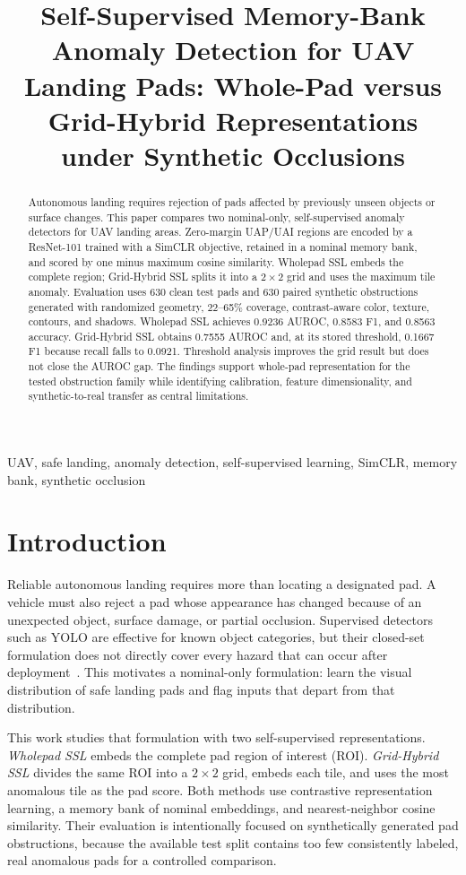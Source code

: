 \documentclass[conference]{IEEEtran}
\title{Self-Supervised Memory-Bank Anomaly Detection for UAV Landing Pads: Whole-Pad versus Grid-Hybrid Representations under Synthetic Occlusions}
\author{\IEEEauthorblockN{Tolga Ferhan K\"u\c{c}\"uk}
\IEEEauthorblockA{Department of Computer Engineering\\
Kocaeli University, Kocaeli, T\"urkiye\\
\href{mailto:kucuktolgaferhan@gmail.com}{kucuktolgaferhan@gmail.com}\\
\url{https://github.com/tolgafk}}}
\begin{document}
\maketitle
\begin{abstract}
Autonomous landing requires rejection of pads affected by previously unseen objects or surface changes. This paper compares two nominal-only, self-supervised anomaly detectors for UAV landing areas. Zero-margin UAP/UAI regions are encoded by a ResNet-101 trained with a SimCLR objective, retained in a nominal memory bank, and scored by one minus maximum cosine similarity. Wholepad SSL embeds the complete region; Grid-Hybrid SSL splits it into a $2\times2$ grid and uses the maximum tile anomaly. Evaluation uses 630 clean test pads and 630 paired synthetic obstructions generated with randomized geometry, 22--65\% coverage, contrast-aware color, texture, contours, and shadows. Wholepad SSL achieves 0.9236 AUROC, 0.8583 F1, and 0.8563 accuracy. Grid-Hybrid SSL obtains 0.7555 AUROC and, at its stored threshold, 0.1667 F1 because recall falls to 0.0921. Threshold analysis improves the grid result but does not close the AUROC gap. The findings support whole-pad representation for the tested obstruction family while identifying calibration, feature dimensionality, and synthetic-to-real transfer as central limitations.
\end{abstract}
\begin{IEEEkeywords}
UAV, safe landing, anomaly detection, self-supervised learning, SimCLR, memory bank, synthetic occlusion
\end{IEEEkeywords}

\section{Introduction}
Reliable autonomous landing requires more than locating a designated pad. A vehicle must also reject a pad whose appearance has changed because of an unexpected object, surface damage, or partial occlusion. Supervised detectors such as YOLO are effective for known object categories, but their closed-set formulation does not directly cover every hazard that can occur after deployment~\cite{redmon2016,ruff2021}. This motivates a nominal-only formulation: learn the visual distribution of safe landing pads and flag inputs that depart from that distribution.

This work studies that formulation with two self-supervised representations. \emph{Wholepad SSL} embeds the complete pad region of interest (ROI). \emph{Grid-Hybrid SSL} divides the same ROI into a $2\times2$ grid, embeds each tile, and uses the most anomalous tile as the pad score. Both methods use contrastive representation learning, a memory bank of nominal embeddings, and nearest-neighbor cosine similarity. Their evaluation is intentionally focused on synthetically generated pad obstructions, because the available test split contains too few consistently labeled, real anomalous pads for a controlled comparison.
\end{document}
